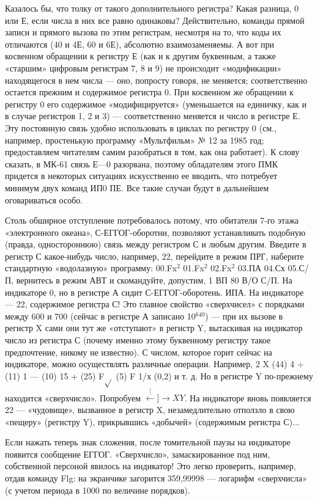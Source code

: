\documentclass[11pt,a4paper,oneside]{article}
\def\XY{$\stackrel[\leftarrow]{\rightarrow}{XY}$}
\begin{document}
Казалось бы, что толку от такого дополнительного регистра? Какая разница, 0 или Е, если числа в них все равно одинаковы? Действительно, команды прямой записи и прямого вызова по этим регистрам, несмотря на то, что коды их отличаются (40 и 4Е, 60 и 6Е), абсолютно взаимозаменяемы. А вот при косвенном обращении к регистру Е (как и к другим буквенным, а также «старшим» цифровым регистрам 7, 8 и 9) не происходит «модификации» находящегося в нем числа — оно, попросту говоря, не меняется; соответственно остается прежним и содержимое регистра 0. При косвенном же обращении к регистру 0 его содержимое «модифицируется» (уменьшается на единичку, как и в случае регистров 1, 2 и 3) — соответственно меняется и число в регистре Е. Эту постоянную связь удобно использовать в циклах по регистру 0 (см., например, простенькую программу «Мультфильм» № 12 за 1985 год; предоставляем читателям самим разобраться в том, как она работает). К слову сказать, в МК-61 связь Е—0 разорвана, поэтому обладателям этого ПМК придется в некоторых ситуациях искусственно ее вводить, что потребует минимум двух команд ИП0 ПЕ. Все такие случаи будут в дальнейшем оговариваться особо.

Столь обширное отступление потребовалось потому, что обитатели 7-го этажа «электронного океана», С-ЕГГОГ-оборотни, позволяют устанавливать подобную (правда, одностороннюю) связь между регистром С и любым другим. Введите в регистр С какое-нибудь число, например, 22, перейдите в режим ПРГ, наберите стандартную «водолазную» программу: 00.Fx$^{2}$ 01.Fx$^{2}$ 02.Fx$^{2}$ 03.ПА 04.Сх 05.С/П, вернитесь в режим АВТ и скомандуйте, допустим, 1 ВП 80 В/О С/П. На индикаторе 0, но в регистре А сидит С-ЕГГОГ-оборотень. ИПА. На индикаторе — 22, содержимое регистра С! Это главное свойство «сверхчисел» с порядками между 600 и 700 (сейчас в регистре А записано 10$^{640}$) — при их вызове в регистр X сами они тут же «отступают» в регистр Y, вытаскивая на индикатор число из регистра С (почему именно этому буквенному регистру такое предпочтение, никому не известно). С числом, которое горит сейчас на индикаторе, можно осуществлять различные операции. Например, 2 X (44) 4 $\div$ (11) 1 — (10) 15 + (25) F$\sqrt{}$ (5) F 1/х (0,2) и т. д. Но в регистре Y по-прежнему находится «сверхчисло». Попробуем \XY. На индикаторе вновь появляется 22 — «чудовище», вызванное в регистр X, незамедлительно отползло в свою «пещеру» (регистру Y), прикрывшись «добычей» (содержимым регистра С)...

Если нажать теперь знак сложения, после томительной паузы на индикаторе появится сообщение ЕГГОГ. «Сверхчисло», замаскированное под ним, собственной персоной явилось на индикатор! Это легко проверить, например, отдав команду Flg: на экранчике загорится 359,99998 — логарифм «сверхчисла» (с учетом периода в 1000 по величине порядков).
\end{document}

